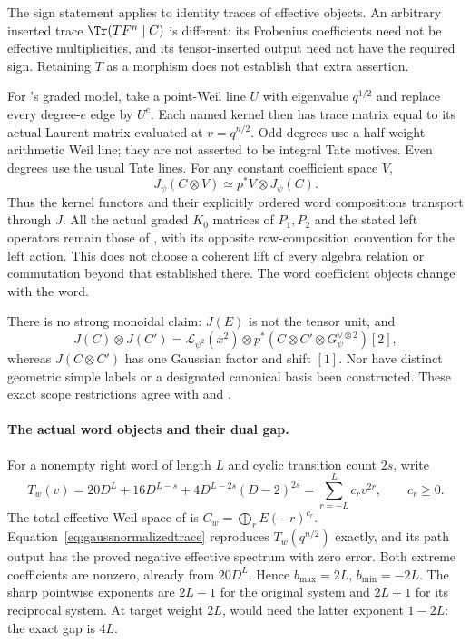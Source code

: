 The sign statement applies to identity traces of effective
objects. An arbitrary inserted trace $\Tr(TF^n\mid C)$ is
different: its Frobenius coefficients need not be effective
multiplicities, and its tensor-inserted output need not have
the required sign. Retaining $T$ as a morphism does not
establish that extra assertion.

For 's graded model, take a point-Weil line $U$
with eigenvalue $q^{1/2}$ and replace every degree-$e$
edge by $U^e$. Each named kernel then has trace matrix
equal to its actual Laurent matrix evaluated at
$v=q^{n/2}$. Odd degrees use a half-weight arithmetic
Weil line; they are not asserted to be integral Tate
motives. Even degrees use the usual Tate lines.
For any constant coefficient space $V$,
\[
 J_\psi(C\otimes V)\simeq p^*V\otimes J_\psi(C).
\]
Thus the kernel functors and their explicitly ordered
word compositions transport through $J$. All the actual
graded $K_0$ matrices of $P_1,P_2$ and the stated left
operators remain those of , with its opposite
row-composition convention for the left action.
This does not choose a coherent lift of every algebra
relation or commutation beyond that established there.
The word coefficient objects change with the word.

There is no strong monoidal claim:
$J(E)$ is not the tensor unit, and
\[
 J(C)\otimes J(C')
 =\mathcal L_{\psi^2}(x^2)\otimes
     p^*(C\otimes C'\otimes G_\psi^{\vee\otimes2})[2],
\]
whereas $J(C\otimes C')$ has one Gaussian factor and
shift $[1]$. Nor have distinct geometric simple labels
or a designated canonical basis been constructed.
These exact scope restrictions agree with 
and .

\paragraph{The actual word objects and their dual gap.}
For a nonempty right word of length $L$ and cyclic
transition count $2s$, write
\[
 T_w(v)=20D^L+16D^{L-s}
          +4D^{L-2s}(D-2)^{2s}
       =\sum_{r=-L}^{L}c_rv^{2r},\qquad c_r\ge0.
\]
The total effective Weil space of  is
$C_w=\bigoplus_r E(-r)^{c_r}$.
Equation~\eqref{eq:gaussnormalizedtrace} reproduces
$T_w(q^{n/2})$ exactly, and its path output has the
proved negative effective spectrum with zero error.
Both extreme coefficients are nonzero, already from
$20D^L$. Hence $b_{\max}=2L$, $b_{\min}=-2L$.
The sharp pointwise exponents are $2L-1$ for the original
system and $2L+1$ for its reciprocal system. At target
weight $2L$,  would need the latter exponent
$1-2L$: the exact gap is $4L$.


